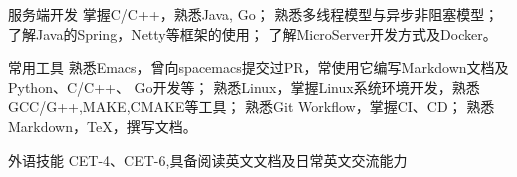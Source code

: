 

\begin{cvskills}

  \cvskill
    {服务端开发} %
    {
      掌握C/C++，熟悉Java, Go；
      熟悉多线程模型与异步非阻塞模型；
      了解Java的Spring，Netty等框架的使用；
      了解MicroServer开发方式及Docker。
    } %

  \cvskill
    {常用工具} %
    {
      熟悉Emacs，曾向spacemacs提交过PR，常使用它编写Markdown文档及Python、C/C++、
      Go开发等； \newline{}
      熟悉Linux，掌握Linux系统环境开发，熟悉GCC/G++,MAKE,CMAKE等工具；\newline{}
      熟悉Git Workflow，掌握CI、CD；\newline{}
      熟悉Markdown，\TeX{}，撰写文档。
    } %


  \cvskill
    {外语技能} %
    {CET-4、CET-6,具备阅读英文文档及日常英文交流能力} %

\end{cvskills}
